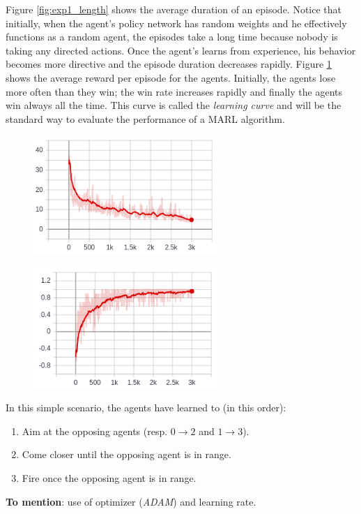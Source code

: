 Figure \ref{fig:exp1_length} shows the average duration of an episode. Notice that initially, when the agent's policy network has random weights and he effectively functions as a random agent, the episodes take a long time because nobody is taking any directed actions. Once the agent's learns from experience, his behavior becomes more directive and the episode duration decreases rapidly. Figure \ref{fig:exp1_reward} shows the average reward per episode for the agents. Initially, the agents lose more often than they win; the win rate increases rapidly and finally the agents win always all the time. This curve is called the \emph{learning curve} and will be the standard way to evaluate the performance of a MARL algorithm.\\

\begin{figure}
\centering
\begin{minipage}{.5\textwidth}
  \centering
  \includegraphics[width=7cm]{images/experiment1/mean_length.png}
  \label{fig:exp1_length}
\end{minipage}%
\begin{minipage}{.5\textwidth}
  \centering
  \includegraphics[width=7cm]{images/experiment1/mean_reward.png}
  \label{fig:exp1_reward}
\end{minipage}
\end{figure}
In this simple scenario, the agents have learned to (in this order):
\begin{enumerate}
    \item Aim at the opposing agents (resp. $0 \rightarrow 2$ and $1 \rightarrow 3$).
    \item Come closer until the opposing agent is in range.
    \item Fire once the opposing agent is in range.
\end{enumerate}
\textbf{To mention}: use of optimizer (\emph{ADAM}) and learning rate.\\

